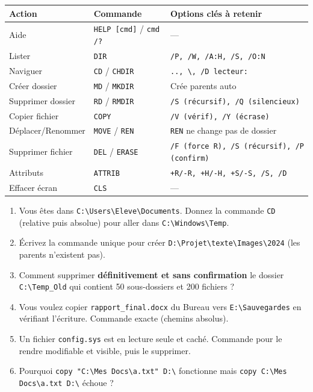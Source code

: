 \documentclass[11pt]{article}
\begin{document}
\begin{aretenir}
\begin{center}
\begin{tabularx}{\linewidth}{|l|l|X|}\hline
\textbf{Action} & \textbf{Commande} & \textbf{Options clés à retenir} \\\hline
Aide & \texttt{HELP [cmd]} / \texttt{cmd /?} & --- \\\hline
Lister & \texttt{DIR} & \texttt{/P, /W, /A:H, /S, /O:N} \\\hline
Naviguer & \texttt{CD} / \texttt{CHDIR} & \texttt{.., \textbackslash, /D lecteur:} \\\hline
Créer dossier & \texttt{MD} / \texttt{MKDIR} & Crée parents auto \\\hline
Supprimer dossier & \texttt{RD} / \texttt{RMDIR} & \texttt{/S (récursif), /Q (silencieux)} \\\hline
Copier fichier & \texttt{COPY} & \texttt{/V (vérif), /Y (écrase)} \\\hline
Déplacer/Renommer & \texttt{MOVE} / \texttt{REN} & \texttt{REN} ne change pas de dossier \\\hline
Supprimer fichier & \texttt{DEL} / \texttt{ERASE} & \texttt{/F (force R), /S (récursif), /P (confirm)} \\\hline
Attributs & \texttt{ATTRIB} & \texttt{+R/-R, +H/-H, +S/-S, /S, /D} \\\hline
Effacer écran & \texttt{CLS} & --- \\\hline
\end{tabularx}
\end{center}
\end{aretenir}

\begin{exercice}
\begin{enumerate}
    \item Vous êtes dans \texttt{C:\textbackslash Users\textbackslash Eleve\textbackslash Documents}. Donnez la commande \texttt{CD} (relative puis absolue) pour aller dans \texttt{C:\textbackslash Windows\textbackslash Temp}.
    \item Écrivez la commande unique pour créer \texttt{D:\textbackslash Projet\textbackslash texte\textbackslash Images\textbackslash 2024} (les parents n'existent pas).
    \item Comment supprimer \textbf{définitivement et sans confirmation} le dossier \texttt{C:\textbackslash Temp\_Old} qui contient 50 sous-dossiers et 200 fichiers ?
    \item Vous voulez copier \texttt{rapport\_final.docx} du Bureau vers \texttt{E:\textbackslash Sauvegardes} en vérifiant l'écriture. Commande exacte (chemins absolus).
    \item Un fichier \texttt{config.sys} est en lecture seule et caché. Commande pour le rendre modifiable et visible, puis le supprimer.
    \item Pourquoi \texttt{copy "C:\textbackslash Mes Docs\textbackslash a.txt" D:\textbackslash} fonctionne mais \texttt{copy C:\textbackslash Mes Docs\textbackslash a.txt D:\textbackslash} échoue ?
\end{enumerate}
\end{exercice}
\end{document}
